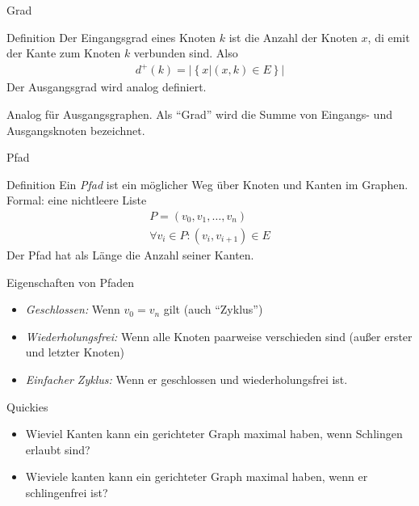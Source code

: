\begin{frame}{Grad}
    \begin{block}{Definition}
        Der Eingangsgrad eines Knoten $k$ ist die Anzahl der Knoten $x$, di emit der Kante zum Knoten $k$ verbunden sind. Also
        \begin{align*}
            d^+\left( k \right) = \big| \left\{ x \big| \left( x,k \right)\in E \right\}\big|
        \end{align*}
        Der Ausgangsgrad wird analog definiert.
    \end{block}
    Analog für Ausgangsgraphen.
    Als ``Grad'' wird die Summe von Eingangs- und Ausgangsknoten bezeichnet.  
\end{frame}
\begin{frame}{Pfad}
    \begin{block}{Definition}
        Ein \emph{Pfad} ist ein möglicher Weg über Knoten und Kanten im Graphen.\\
        Formal: eine nichtleere Liste
        \begin{align*}
            P = \left( v_0,v_1,\dots , v_n \right)\\
            \forall v_i \in P: \left( v_i,v_{i+1} \right) \in E
        \end{align*}
        Der Pfad hat als Länge die Anzahl seiner Kanten.
    \end{block}
\end{frame}
\begin{frame}{Eigenschaften von Pfaden}
    \begin{itemize}
        \item \emph{Geschlossen:} Wenn $v_0 = v_n$ gilt (auch ``Zyklus'')
        \item \emph{Wiederholungsfrei:} Wenn alle Knoten paarweise verschieden sind (außer erster und letzter Knoten)
        \item \emph{Einfacher Zyklus:} Wenn er geschlossen und wiederholungsfrei ist.
    \end{itemize}
\end{frame}

\begin{frame}{Quickies}
    \begin{itemize}
        \item Wieviel Kanten kann ein gerichteter Graph maximal haben, wenn Schlingen erlaubt sind?
        \item Wieviele kanten kann ein gerichteter Graph maximal haben, wenn er schlingenfrei ist?
    \end{itemize}
\end{frame}

